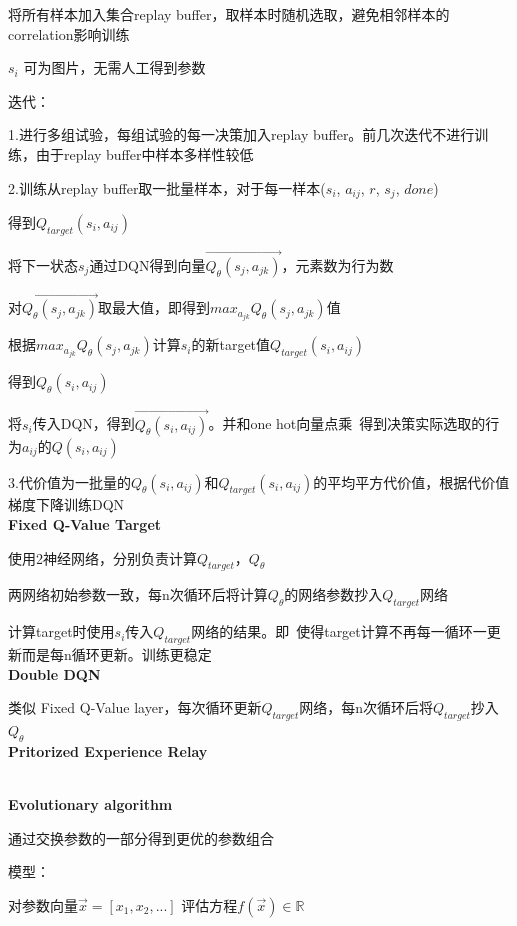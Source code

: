 \documentclass[UTF8]{ctexart}
\begin{document}
  \quad 将所有样本加入集合replay buffer，取样本时随机选取，避免相邻样本的correlation影响训练

  \quad $s_i$ 可为图片，无需人工得到参数
  
  迭代：
  
  \quad 1.进行多组试验，每组试验的每一决策加入replay buffer。前几次迭代不进行训练，由于replay buffer中样本多样性较低
  
  \quad 2.训练从replay buffer取一批量样本，对于每一样本($s_i$, $a_{ij}$, $r$, $s_j$, $done$)

  \quad \quad 得到$Q_{target}(s_i, a_{ij})$
  
  \quad \quad \quad 将下一状态$s_j$通过DQN得到向量$\vec{Q_{\theta}(s_j, a_{jk})}$，元素数为行为数

  \quad \quad \quad 对$\vec{Q_{\theta}(s_j, a_{jk})}$取最大值，即得到$max_{a_{jk}} Q_{\theta}(s_j, a_{jk})$值

  \quad \quad \quad 根据$max_{a_{jk}} Q_{\theta}(s_j, a_{jk})$计算$s_i$的新target值$Q_{target}(s_i, a_{ij})$

  \quad \quad 得到$Q_{\theta}(s_i, a_{ij})$

  \quad \quad \quad 将$s_i$传入DQN，得到$\vec{Q_{\theta}(s_i, a_{ij})}$。并和one hot向量点乘\ 得到决策实际选取的行为$a_{ij}$的$Q(s_i, a_{ij})$

  \quad 3.代价值为一批量的$Q_{\theta}(s_i, a_{ij})$和$Q_{target}(s_i, a_{ij})$的平均平方代价值，根据代价值梯度下降训练DQN\\
\textbf{Fixed Q-Value Target}

  使用2神经网络，分别负责计算$Q_{target}$，$Q_{\theta}$

  两网络初始参数一致，每n次循环后将计算$Q_{\theta}$的网络参数抄入$Q_{target}$网络

  计算target时使用$s_i$传入$Q_{target}$网络的结果。即\ 使得target计算不再每一循环一更新而是每n循环更新。训练更稳定\\
\textbf{Double DQN} 

  类似 Fixed Q-Value layer，每次循环更新$Q_{target}$网络，每n次循环后将$Q_{target}$抄入$Q_{\theta}$\\
\textbf{Pritorized Experience Relay}

  \\
\textbf{Evolutionary algorithm}

  通过交换参数的一部分得到更优的参数组合

  模型：

  \quad 对参数向量$\vec{x} = [x_1, x_2, ...]$ 评估方程$f(\vec{x}) \in \mathbb{R} $
\end{document}
